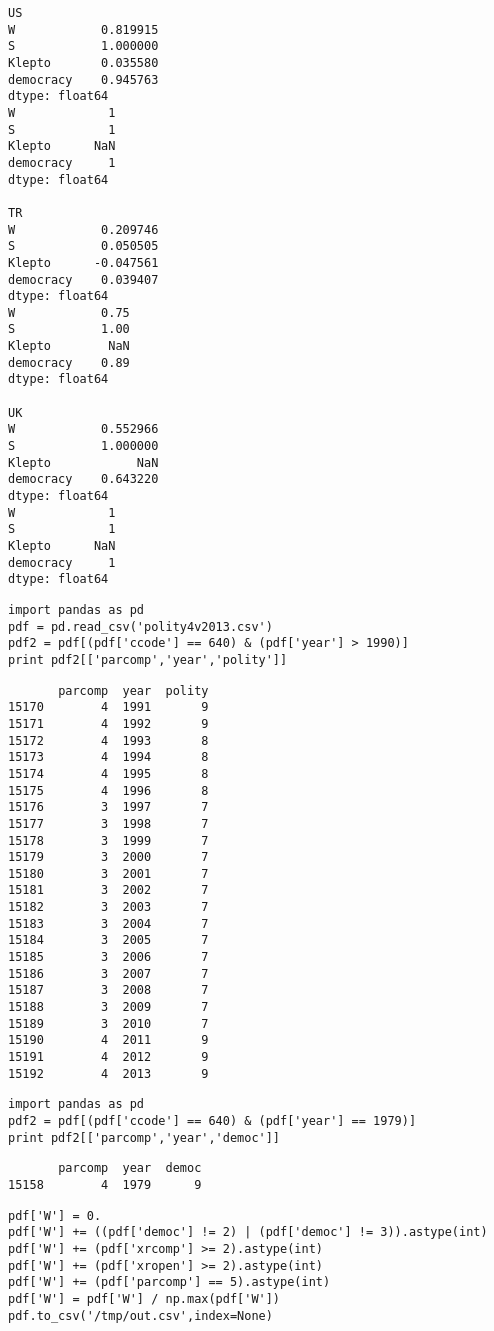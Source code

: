 \documentclass[12pt,fleqn]{article}\usepackage{common}
\begin{document}
\begin{verbatim}
US
W            0.819915
S            1.000000
Klepto       0.035580
democracy    0.945763
dtype: float64
W             1
S             1
Klepto      NaN
democracy     1
dtype: float64

TR
W            0.209746
S            0.050505
Klepto      -0.047561
democracy    0.039407
dtype: float64
W            0.75
S            1.00
Klepto        NaN
democracy    0.89
dtype: float64

UK
W            0.552966
S            1.000000
Klepto            NaN
democracy    0.643220
dtype: float64
W             1
S             1
Klepto      NaN
democracy     1
dtype: float64
\end{verbatim}

\begin{verbatim}
import pandas as pd
pdf = pd.read_csv('polity4v2013.csv')
pdf2 = pdf[(pdf['ccode'] == 640) & (pdf['year'] > 1990)]
print pdf2[['parcomp','year','polity']]
\end{verbatim}

\begin{verbatim}
       parcomp  year  polity
15170        4  1991       9
15171        4  1992       9
15172        4  1993       8
15173        4  1994       8
15174        4  1995       8
15175        4  1996       8
15176        3  1997       7
15177        3  1998       7
15178        3  1999       7
15179        3  2000       7
15180        3  2001       7
15181        3  2002       7
15182        3  2003       7
15183        3  2004       7
15184        3  2005       7
15185        3  2006       7
15186        3  2007       7
15187        3  2008       7
15188        3  2009       7
15189        3  2010       7
15190        4  2011       9
15191        4  2012       9
15192        4  2013       9
\end{verbatim}


\begin{verbatim}
import pandas as pd
pdf2 = pdf[(pdf['ccode'] == 640) & (pdf['year'] == 1979)]
print pdf2[['parcomp','year','democ']]
\end{verbatim}

\begin{verbatim}
       parcomp  year  democ
15158        4  1979      9
\end{verbatim}


\begin{verbatim}
pdf['W'] = 0.
pdf['W'] += ((pdf['democ'] != 2) | (pdf['democ'] != 3)).astype(int)
pdf['W'] += (pdf['xrcomp'] >= 2).astype(int)
pdf['W'] += (pdf['xropen'] >= 2).astype(int)
pdf['W'] += (pdf['parcomp'] == 5).astype(int)
pdf['W'] = pdf['W'] / np.max(pdf['W'])
pdf.to_csv('/tmp/out.csv',index=None)
\end{verbatim}
\end{document}
